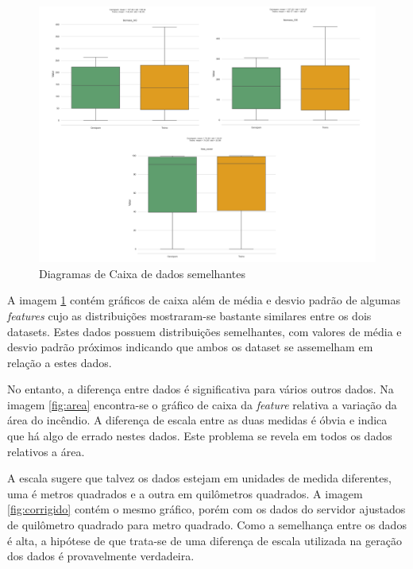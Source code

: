 \begin{figure}[H]
	\centering
	\begin{minipage}{0.98\linewidth}
		\centering
		\includegraphics[scale=0.5]{tg1/figuras/graficosbons.png}
		\caption{Diagramas de Caixa de dados semelhantes}
            \label{fig:dadosbons}
	\end{minipage}
\end{figure}

A imagem \ref{fig:dadosbons} contém gráficos de caixa além de média e desvio padrão de algumas \textit{features} cujo as distribuições mostraram-se bastante similares entre os dois datasets. Estes dados possuem distribuições semelhantes, com valores de média e desvio padrão próximos indicando que ambos os dataset se assemelham em relação a estes dados.

No entanto, a diferença entre dados é significativa para vários outros dados. Na imagem \ref{fig:area} encontra-se o gráfico de caixa da \textit{feature} relativa a variação da área do incêndio. A diferença de escala entre as duas medidas é óbvia e indica que há algo de errado nestes dados. Este problema se revela em todos os dados relativos a área.

A escala sugere que talvez os dados estejam em unidades de medida diferentes, uma é metros quadrados e a outra em quilômetros quadrados. A imagem \ref{fig:corrigido} contém o mesmo gráfico, porém com os dados do servidor ajustados de quilômetro quadrado para metro quadrado. Como a semelhança entre os dados é alta, a hipótese de que trata-se de uma diferença de escala utilizada na geração dos dados é provavelmente verdadeira.

